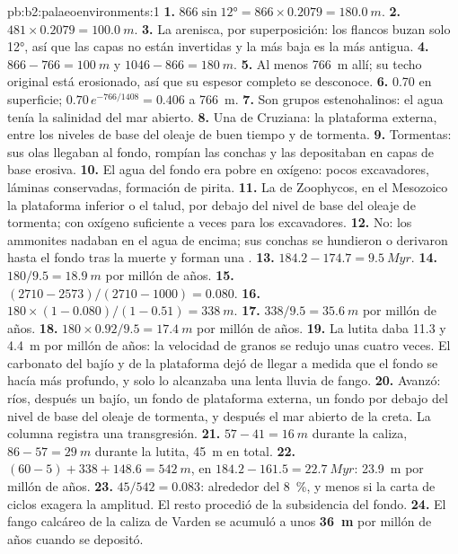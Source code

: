 \begin{solution}{pb:b2:palaeoenvironments:1}
\textbf{1.} $866 \sin \ang{12} = 866 \times 0.2079 = \qty{180.0}{m}$.
\textbf{2.} $481 \times 0.2079 = \qty{100.0}{m}$.
\textbf{3.} La arenisca, por superposición: los flancos buzan solo \ang{12}, así que las capas no están
invertidas y la más baja es la más antigua.
\textbf{4.} $866 - 766 = \qty{100}{m}$ y $1046 - 866 = \qty{180}{m}$.
\textbf{5.} Al menos \qty{766}{m} allí; su techo original está erosionado, así que su espesor completo se
desconoce.
\textbf{6.} 0.70 en superficie; $0.70\,e^{-766/1408} = 0.406$ a \qty{766}{m}.
\textbf{7.} Son grupos estenohalinos: el agua tenía la salinidad del mar abierto.
\textbf{8.} Una  de Cruziana: la plataforma externa, entre los niveles de base del oleaje de buen tiempo y de
tormenta.
\textbf{9.} Tormentas: sus olas llegaban al fondo, rompían las conchas y las depositaban en capas
de base erosiva.
\textbf{10.} El agua del fondo era pobre en oxígeno: pocos excavadores, láminas conservadas, formación de pirita.
\textbf{11.} La  de Zoophycos, en el Mesozoico la plataforma inferior o el talud, por debajo del
nivel de base del oleaje de tormenta; con oxígeno suficiente a veces para los excavadores.
\textbf{12.} No: los ammonites nadaban en el agua de encima; sus conchas se hundieron o derivaron hasta el fondo
tras la muerte y forman una .
\textbf{13.} $184.2 - 174.7 = \qty{9.5}{Myr}$.
\textbf{14.} $180/9.5 = \qty{18.9}{m}$ por millón de años.
\textbf{15.} $(2710 - 2573)/(2710 - 1000) = 0.080$.
\textbf{16.} $180 \times (1 - 0.080)/(1 - 0.51) = \qty{338}{m}$.
\textbf{17.} $338/9.5 = \qty{35.6}{m}$ por millón de años.
\textbf{18.} $180 \times 0.92/9.5 = \qty{17.4}{m}$ por millón de años.
\textbf{19.} La lutita daba 11.3 y \qty{4.4}{m} por millón de años: la velocidad de granos se redujo
unas cuatro veces. El carbonato del bajío y de la plataforma dejó de llegar a medida que el fondo
se hacía más profundo, y solo lo alcanzaba una lenta lluvia de fango.
\textbf{20.} Avanzó: ríos, después un bajío, un fondo de plataforma externa, un fondo por debajo del nivel de base del oleaje de tormenta,
y después el mar abierto de la creta. La columna registra una transgresión.
\textbf{21.} $57 - 41 = \qty{16}{m}$ durante la caliza, $86 - 57 = \qty{29}{m}$ durante la lutita,
\qty{45}{m} en total.
\textbf{22.} $(60 - 5) + 338 + 148.6 = \qty{542}{m}$, en $184.2 - 161.5 = \qty{22.7}{Myr}$:
\qty{23.9}{m} por millón de años.
\textbf{23.} $45/542 = 0.083$: alrededor del \qty{8}{\percent}, y menos si la carta de ciclos exagera
la amplitud. El resto procedió de la subsidencia del fondo.
\textbf{24.} El fango calcáreo de la caliza de Varden se acumuló a unos
\textbf{\qty[text-series-to-math=true]{36}{m}} por millón de años cuando se depositó.
\end{solution}
